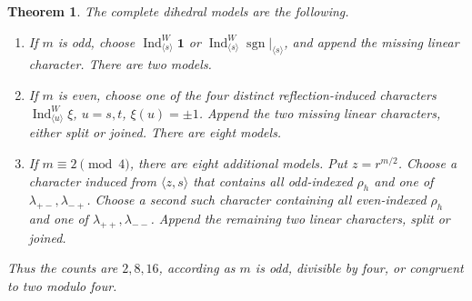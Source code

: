 \documentclass[11pt]{article}
\numberwithin{equation}{section}
\newtheorem{theorem}{Theorem}[section]
\theoremstyle{definition}
\DeclareMathOperator{\Ind}{Ind}
\DeclareMathOperator{\sgn}{sgn}
\newcommand{\one}{\mathbf 1}
\begin{document}
\begin{theorem}\label{thm:dihedral}
The complete dihedral models are the following.
\begin{enumerate}[label=(\roman*)]
\item If \(m\) is odd, choose \(\Ind_{\langle s\rangle}^W\one\) or
\(\Ind_{\langle s\rangle}^W\sgn|_{\langle s\rangle}\), and append the missing linear character. There are two models.
\item If \(m\) is even, choose one of the four distinct reflection-induced characters
\(\Ind_{\langle u\rangle}^W\xi\), \(u=s,t\), \(\xi(u)=\pm1\).
Append the two missing linear characters, either split or joined. There are eight models.
\item If \(m\equiv2\pmod4\), there are eight additional models.
Put \(z=r^{m/2}\).
Choose a character induced from \(\langle z,s\rangle\) that contains all odd-indexed \(\rho_h\) and one of \(\lambda_{+-},\lambda_{-+}\).
Choose a second such character containing all even-indexed \(\rho_h\) and one of \(\lambda_{++},\lambda_{--}\).
Append the remaining two linear characters, split or joined.
\end{enumerate}
Thus the counts are \(2,8,16\), according as \(m\) is odd, divisible by four, or congruent to two modulo four.
\end{theorem}
\end{document}
